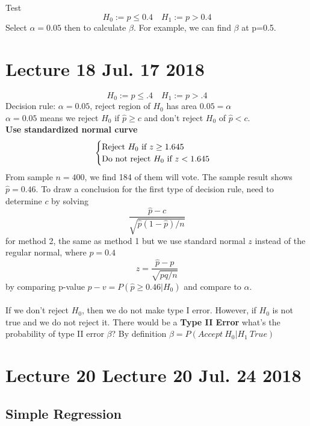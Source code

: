 \documentclass{article}
\begin{document}
		\begin{example}
			Test 
			\[
				H_0 := p \leq 0.4 \quad
				H_1 := p > 0.4
			\]
			Select $\alpha = 0.05$ then to calculate $\beta$. For example, we can find $\beta$ at p=0.5.
		\end{example}



	\section{Lecture 18 Jul. 17 2018}
		\begin{example}
			\[
				H_0 := p \leq .4 \quad
				H_1 := p > .4
			\]
			Decision rule: $\alpha = 0.05$, reject region of $H_0$ has area $0.05 = \alpha$
			\\
			$\alpha = 0.05$ means we reject $H_0$ if $\hat{p} \geq c$ and don't reject $H_0$ of $\hat{p} < c$.
			\\
			\textbf{Use standardized normal curve} 
			\[
				\begin{cases}
					\text{{Reject $H_0$ if }} z \geq 1.645 \\
					\text{{Do not reject $H_0$ if }} z < 1.645
				\end{cases}
			\]
			From sample $n=400$, we find 184 of them will vote. The sample result shows $\hat{p} = 0.46$.
			To draw a conclusion for the first type of decision rule, need to determine $c$ by solving
			\[
				\frac{\hat{p}-c}{\sqrt{\hat{p}(1-\hat{p})/n}}
			\]
			for method 2, the same as method 1 but we use standard normal $z$ instead of the regular normal, where $p=0.4$
			\[
				z = \frac{\hat{p} - p}{\sqrt{pq/n}}
			\]
			by comparing p-value $p-v = P(\hat{p} \geq 0.46 | H_0)$ and compare to $\alpha$.
		\end{example}

		\paragraph{} If we don't reject $H_0$, then we do not make type I error. However, if $H_0$ is not true and we do not reject it. 
			There would be a \textbf{Type II Error} what's the probability of type II error $\beta$? By definition $\beta=P(Accept\ H_0 | H_1 \ True)$
		
	\section{Lecture 20 Lecture 20 Jul. 24 2018}
	    \subsection{Simple Regression}
\end{document}
